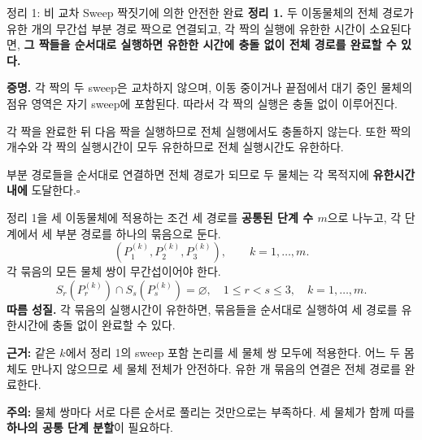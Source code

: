 \begin{frame}{정리 1: 비 교차 Sweep 짝짓기에 의한 안전한 완료}
\textbf{정리 1.} 두 이동물체의 전체 경로가 유한 개의 무간섭 부분 경로 짝으로 연결되고, 각 짝의 실행에 유한한 시간이 소요된다면, \textbf{그 짝들을 순서대로 실행하면 유한한 시간에 충돌 없이 전체 경로를 완료할 수 있다.}
\medskip\par
\textbf{증명.} 각 짝의 두 sweep은 교차하지 않으며, 이동 중이거나 끝점에서 대기 중인 물체의 점유 영역은 자기 sweep에 포함된다. 따라서 각 짝의 실행은 충돌 없이 이루어진다.
\medskip\par
각 짝을 완료한 뒤 다음 짝을 실행하므로 전체 실행에서도 충돌하지 않는다. 또한 짝의 개수와 각 짝의 실행시간이 모두 유한하므로 전체 실행시간도 유한하다.
\medskip\par
부분 경로들을 순서대로 연결하면 전체 경로가 되므로 두 물체는 각 목적지에 \textbf{유한시간 내에} 도달한다.\hfill$\square$
\end{frame}

\begin{frame}{정리 1을 세 이동물체에 적용하는 조건}
세 경로를 \textbf{공통된 단계 수 $m$}으로 나누고, 각 단계에서 세 부분 경로를 하나의 묶음으로 둔다.
\[
\left(P_1^{(k)},P_2^{(k)},P_3^{(k)}\right),\qquad k=1,\ldots,m.
\]
각 묶음의 모든 물체 쌍이 무간섭이어야 한다.
\begin{equation}
S_r(P_r^{(k)})\cap S_s(P_s^{(k)})=\varnothing,
\quad 1\le r<s\le3,\quad k=1,\ldots,m.
\tag{14}
\end{equation}
\textbf{따름 성질.} 각 묶음의 실행시간이 유한하면, 묶음들을 순서대로 실행하여 세 경로를 유한시간에 충돌 없이 완료할 수 있다.
\medskip\par
\small \textbf{근거:} 같은 $k$에서 정리 1의 sweep 포함 논리를 세 물체 쌍 모두에 적용한다. 어느 두 몸체도 만나지 않으므로 세 물체 전체가 안전하다. 유한 개 묶음의 연결은 전체 경로를 완료한다.
\medskip\par
\textbf{주의:} 물체 쌍마다 서로 다른 순서로 풀리는 것만으로는 부족하다. 세 물체가 함께 따를 \textbf{하나의 공통 단계 분할}이 필요하다.
\end{frame}

